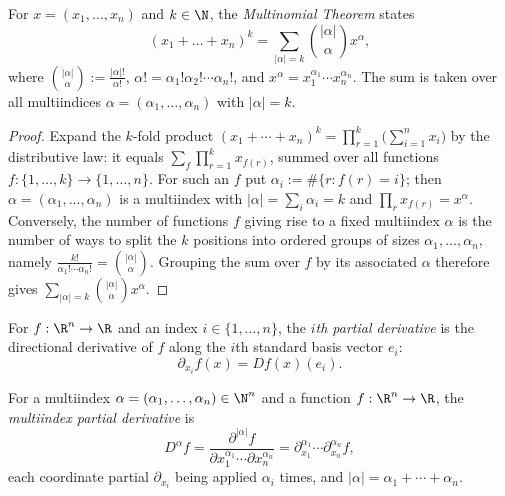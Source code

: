 \begin{proposition}
\label{ex:multinomial-theorem}
\leanok
For $x = (x_1, \ldots, x_n)$ and $k \in \N$, the \textit{Multinomial Theorem} states
$$\left(x_1 + \ldots + x_n\right)^k = \sum_{|\alpha|=k} \binom{|\alpha|}{\alpha} x^\alpha,$$
where $\binom{|\alpha|}{\alpha} := \frac{|\alpha|!}{\alpha!}$, $\alpha! = \alpha_1!\alpha_2! \cdots \alpha_n!$, and $x^\alpha = x_1^{\alpha_1} \cdots x_n^{\alpha_n}$. The sum is taken over all multiindices $\alpha = (\alpha_1, \ldots, \alpha_n)$ with $|\alpha| = k$.
\end{proposition}
\begin{proof}
\leanok
Expand the $k$-fold product $(x_1 + \cdots + x_n)^k = \prod_{r=1}^{k}\bigl(\sum_{i=1}^n x_i\bigr)$ by the distributive law: it equals $\sum_{f} \prod_{r=1}^{k} x_{f(r)}$, summed over all functions $f : \{1,\ldots,k\} \to \{1,\ldots,n\}$. For such an $f$ put $\alpha_i := \#\{r : f(r) = i\}$; then $\alpha = (\alpha_1,\ldots,\alpha_n)$ is a multiindex with $|\alpha| = \sum_i \alpha_i = k$ and $\prod_{r} x_{f(r)} = x^\alpha$. Conversely, the number of functions $f$ giving rise to a fixed multiindex $\alpha$ is the number of ways to split the $k$ positions into ordered groups of sizes $\alpha_1, \ldots, \alpha_n$, namely $\frac{k!}{\alpha_1!\cdots\alpha_n!} = \binom{|\alpha|}{\alpha}$. Grouping the sum over $f$ by its associated $\alpha$ therefore gives $\sum_{|\alpha|=k} \binom{|\alpha|}{\alpha} x^\alpha$.
\end{proof}

\begin{definition}
\label{def:partial-derivative}
\leanok
For $f : \R^n \to \R$ and an index $i \in \{1, \ldots, n\}$, the \textit{$i$th
partial derivative} is the directional derivative of $f$ along the $i$th standard
basis vector $e_i$:
$$\partial_{x_i} f (x) = Df(x)(e_i).$$
\end{definition}

\begin{definition}
\label{def:multiindex-partial-derivative}
\leanok
For a multiindex $\alpha = (\alpha_1, \ldots, \alpha_n) \in \N^n$ and a function
$f : \R^n \to \R$, the \textit{multiindex partial derivative} is
$$D^\alpha f = \frac{\partial^{|\alpha|} f}{\partial x_1^{\alpha_1} \cdots \partial x_n^{\alpha_n}}
  = \partial_{x_1}^{\alpha_1} \cdots \partial_{x_n}^{\alpha_n} f,$$
each coordinate partial $\partial_{x_i}$ being applied $\alpha_i$ times, and
$|\alpha| = \alpha_1 + \cdots + \alpha_n$.
\end{definition}


